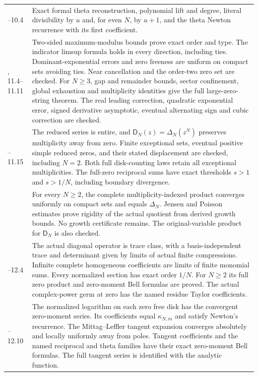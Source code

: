 \documentclass[11pt,letterpaper]{article}
\theoremstyle{definition}
\theoremstyle{remark}
\newcommand{\Dfun}{\mathsf D}
\begin{document}
\begin{longtable}{@{}>{\raggedright\arraybackslash}p{}>{\raggedright\arraybackslash}p{}@{}}
10.1--10.4 & Exact formal theta reconstruction, polynomial lift and degree,
literal divisibility by $u$ and, for even $N$, by $u+1$, and the theta Newton
recurrence with its first coefficient. \\
11.2, 11.4--11.11 & Two-sided maximum-modulus bounds prove exact order
and type. The indicator limsup formula holds in every direction, including ties.
Dominant-exponential errors and zero freeness are uniform on compact sets
avoiding ties. Near cancellation and the order-two zero set are checked.
For $N\geq3$, gap and remainder bounds, sector confinement, global exhaustion
and multiplicity identities give the full large-zero-string theorem.
The real leading correction, quadratic exponential error, signed derivative
asymptotic, eventual alternating sign and cubic correction are checked. \\
11.13--11.15 & The reduced series is entire, and
$\Dfun_N(z)=\Delta_N(z^N)$ preserves multiplicity away from zero. Finite
exceptional sets, eventual positive simple reduced zeros, and their stated
displacement are checked, including $N=2$. Both full disk-counting laws
retain all exceptional multiplicities. The full-zero reciprocal sums have
exact thresholds $s>1$ and $s>1/N$, including boundary divergence. \\
12.1 & For every $N\geq2$, the complete multiplicity-indexed product
converges uniformly on compact sets and equals $\Delta_N$. Jensen and Poisson
estimates prove rigidity of the actual quotient from derived growth bounds.
No growth certificate remains. The original-variable product for $\Dfun_N$
is also checked. \\
12.2--12.4 & The actual diagonal operator is trace class, with a
basis-independent trace and determinant given by limits of actual finite
compressions. Infinite complete homogeneous coefficients are limits of finite
monomial sums. Every normalized section has exact order $1/N$. For $N\geq2$
its full zero product and zero-moment Bell formulas are proved. The actual
complex-power germ at zero has the named residue Taylor coefficients. \\
12.6--12.10 & The normalized logarithm on each zero free disk has the
convergent zero-moment series. Its coefficients equal $\kappa_{N,m}$ and
satisfy Newton's recurrence. The Mittag--Leffler tangent expansion converges
absolutely and locally uniformly away from poles. Tangent coefficients and
the named reciprocal and theta families have their exact zero-moment Bell
formulas. The full tangent series is identified with the analytic function. \\

\end{longtable}
\end{document}
